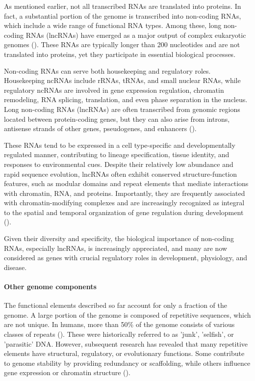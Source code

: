As mentioned earlier, not all transcribed RNAs are translated into proteins.
In fact, a substantial portion of the genome is transcribed into non-coding RNAs, which include a wide range of functional RNA types.
Among these, long non-coding RNAs (lncRNAs) have emerged as a major output of complex eukaryotic genomes (\cite{Mattick2023}).
These RNAs are typically longer than 200 nucleotides and are not translated into proteins, yet they participate in essential biological processes.

Non-coding RNAs can serve both housekeeping and regulatory roles.
Housekeeping ncRNAs include rRNAs, tRNAs, and small nuclear RNAs, while regulatory ncRNAs
are involved in gene expression regulation, chromatin remodeling, RNA splicing, translation, and even phase separation in the nucleus.
Long non-coding RNAs (lncRNAs) are often transcribed from genomic regions located between protein-coding genes,
but they can also arise from introns, antisense strands of other genes, pseudogenes, and enhancers (\cite{Poliseno2024}).

These RNAs tend to be expressed in a cell type-specific and developmentally regulated manner, contributing to lineage specification,
tissue identity, and responses to environmental cues.
Despite their relatively low abundance and rapid sequence evolution, lncRNAs often exhibit conserved structure-function features,
such as modular domains and repeat elements that mediate interactions with chromatin, RNA, and proteins.
Importantly, they are frequently associated with chromatin-modifying complexes and are increasingly recognized
as integral to the spatial and temporal organization of gene regulation during development (\cite{Mattick2023}).

Given their diversity and specificity, the biological importance of non-coding RNAs, especially lncRNAs,
is increasingly appreciated, and many are now considered as genes with crucial regulatory roles in development, physiology, and disease.

\paragraph{Other genome components}

The functional elements described so far account for only a fraction of the genome.
A large portion of the genome is composed of repetitive sequences, which are not unique.
In humans, more than 50\% of the genome consists of various classes of repeats (\cite{Liehr2021}).
These were historically referred to as 'junk', 'selfish', or 'parasitic' DNA.
However, subsequent research has revealed that many repetitive elements have
structural, regulatory, or evolutionary functions.
Some contribute to genome stability by providing redundancy or scaffolding,
while others influence gene expression or chromatin structure (\cite{Shapiro2005}).

